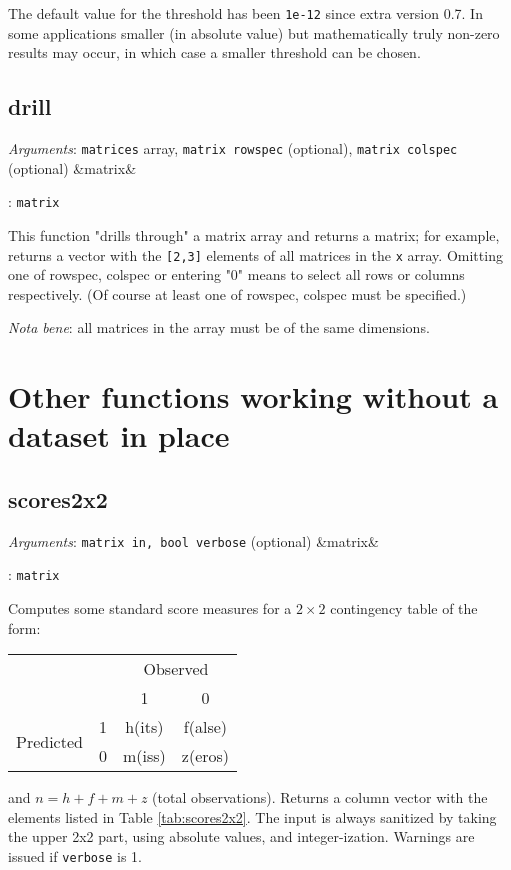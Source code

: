 \documentclass[11pt,english]{article}
\providecommand{\tabularnewline}{\\}
\newcommand{\ArgRet}[2]{%
  {\it Arguments}: {#1}%
  \ifx&#2&%
  \else
  \par\smallskip\noindent {\it Return type}: \texttt{#2}
  \fi%
  \par\medskip\par%
  }
\begin{document}
The default value for the threshold has been \texttt{1e-12} since extra
version 0.7. In some applications smaller (in absolute value) but mathematically
truly non-zero results may occur, in which case a smaller threshold can be chosen.

\subsection{drill}

\ArgRet{\texttt{matrices} array, \texttt{matrix rowspec} (optional),
  \texttt{matrix colspec} (optional)}{matrix}

This function "drills through" a matrix array and returns a matrix;
for example,  returns a vector with the
\texttt{[2,3]} elements of all matrices in the \texttt{x}
array. Omitting one of rowspec, colspec or entering "0" means to
select all rows or columns respectively.  (Of course at least one of
rowspec, colspec must be specified.)

\emph{Nota bene}: all matrices in the array must be of the same dimensions.


\section{Other functions working without a dataset in place}

\subsection{scores2x2}

\ArgRet{\texttt{matrix in, bool verbose} (optional)}{matrix}

Computes some standard score measures for a $2\times 2$ contingency
table of the form:

\begin{center}
\begin{tabular}{cccc}
\toprule
 &  & \multicolumn{2}{c}{Observed}\tabularnewline
 &  & 1 & 0\tabularnewline
\midrule
\multirow{2}{*}{Predicted} & 1 & h(its) & f(alse)\tabularnewline
 & 0 & m(iss) & z(eros)\tabularnewline
\bottomrule
\end{tabular}
\end{center}

\noindent and $n=h+f+m+z$ (total observations). Returns a column vector with the
elements listed in Table \ref{tab:scores2x2}. The input is always
sanitized by taking the upper 2x2 part, using absolute values, and
integer-ization. Warnings are issued if \texttt{verbose} is 1.
\end{document}
